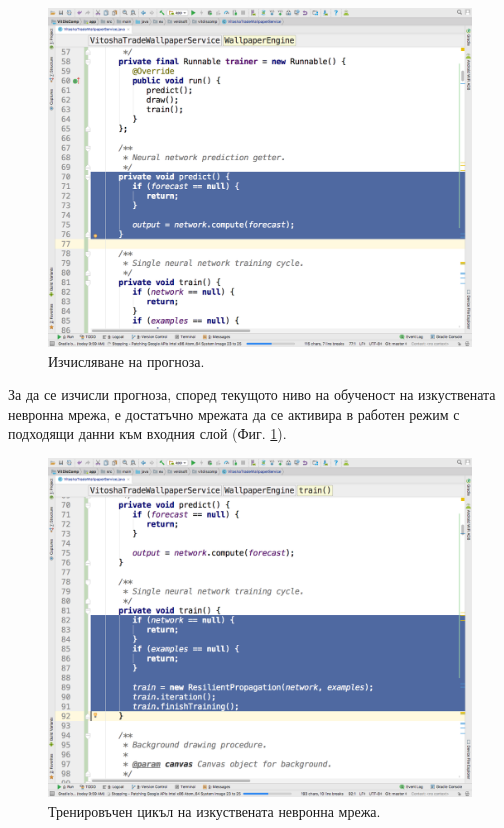 \documentclass[book,14pt,oneside,openany]{memoir}
\begin{document}
\begin{figure}[h]
  \centering
  \includegraphics[height=0.45\pdfpageheight]{./images/pic0048.png}
  \caption{Изчисляване на прогноза.}
\label{fig:pic0048}
\end{figure}
\FloatBarrier

За да се изчисли прогноза, според текущото ниво на обученост на изкуствената невронна мрежа, е достатъчно мрежата да се активира в работен режим с подходящи данни към входния слой (Фиг. \ref{fig:pic0048}).

\begin{figure}[h]
  \centering
  \includegraphics[height=0.45\pdfpageheight]{./images/pic0049.png}
  \caption{Тренировъчен цикъл на изкуствената невронна мрежа.}
\label{fig:pic0049}
\end{figure}
\FloatBarrier
\end{document}
